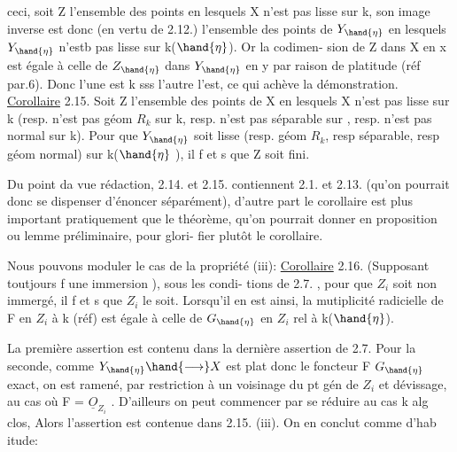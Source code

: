 
ceci, soit Z l'ensemble des points en lesquels X n'est pas lisse sur
k, son image inverse  est donc (en vertu de 2.12.)   l'ensemble des
points de $Y_{\hand{\eta}}$ en lesquels $Y_{\hand{\eta}}$ n'estb pas lisse sur k($\hand{\eta}$). Or  la codimen-%
sion de  Z dans X en x  est égale à celle de  $Z_{\hand{\eta}}$ dans $Y_{\hand{\eta}}$  en y par
raison de platitude (réf par.6). Donc l'une est \hand{$>$}k  sss l'autre l'est,
ce qui achève la démonstration.
\uline{Corollaire} 2.15.   Soit Z l'ensemble des points de X en lesquels
X n'est pas lisse sur k (resp. n'est pas  géom $R_k$ sur k, resp. n'est
\margin{\unsure{//}} pas séparable sur  , resp. n'est pas  normal sur k). Pour que $Y_{\hand{\eta}}$ soit
lisse (resp.  géom $R_k$, resp séparable, resp géom normal) sur k($\hand{\eta}$ ), il
f et s  que Z soit fini.

\margin{$|$} Du point da vue rédaction, 2.14. et 2.15.  contiennent 2.1. et
2.13. (qu'on pourrait donc se dispenser d'énoncer séparément), d'autre
part le corollaire est plus important pratiquement que le théorème,
qu'on pourrait donner en proposition ou lemme préliminaire, pour glori-%
fier plutôt le corollaire.

Nous pouvons  moduler   le cas de la propriété (iii):
\uline{Corollaire} 2.16.  (Supposant toutjours f une immersion ), sous les condi-%
\margin{\unsure{//}} tions de 2.7. , pour que $Z_i$ soit non immergé, il f et s que $Z_i$  le soit.
Lorsqu'il en est ainsi, la mutiplicité radicielle de F en $Z_i$  
à k (réf) est égale à celle de $G_{\hand{\eta}}$  en $Z_i$  rel à k($\hand{\eta}$).

La première assertion est contenu dans la dernière assertion de
2.7. Pour la seconde, comme  $Y_{\hand{\eta}} \hand{\longrightarrow} X$ est plat donc le foncteur F \hand{$\rightsquigarrow$} $G_{\hand{\eta}}$
exact,  on est ramené, par restriction à un voisinage du pt gén de $Z_i$
et dévissage, au cas où F = $\underline{O}_{Z_i}$  . D'ailleurs on peut commencer par
se réduire au cas k alg clos,  Alors  l'assertion  est
contenue dans 2.15. (iii).   On en conclut comme d'hab itude:

